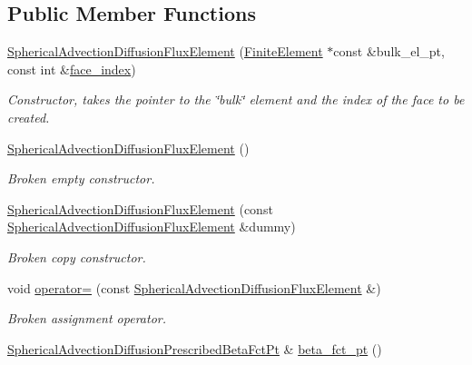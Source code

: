 \subsection*{Public Member Functions}
\begin{DoxyCompactItemize}
\item 
\hyperlink{classoomph_1_1SphericalAdvectionDiffusionFluxElement_aa8fb5f46838d3fbb9d15aca49944c671}{Spherical\+Advection\+Diffusion\+Flux\+Element} (\hyperlink{classoomph_1_1FiniteElement}{Finite\+Element} $\ast$const \&bulk\+\_\+el\+\_\+pt, const int \&\hyperlink{classoomph_1_1FaceElement_a478d577ac6db67ecc80f1f02ae3ab170}{face\+\_\+index})
\begin{DoxyCompactList}\small\item\em Constructor, takes the pointer to the \char`\"{}bulk\char`\"{} element and the index of the face to be created. \end{DoxyCompactList}\item 
\hyperlink{classoomph_1_1SphericalAdvectionDiffusionFluxElement_afd26b6adc3a9a6402b38a3c15fc16c0a}{Spherical\+Advection\+Diffusion\+Flux\+Element} ()
\begin{DoxyCompactList}\small\item\em Broken empty constructor. \end{DoxyCompactList}\item 
\hyperlink{classoomph_1_1SphericalAdvectionDiffusionFluxElement_a85e2f9e5a93f978b21cbf6d425d8c991}{Spherical\+Advection\+Diffusion\+Flux\+Element} (const \hyperlink{classoomph_1_1SphericalAdvectionDiffusionFluxElement}{Spherical\+Advection\+Diffusion\+Flux\+Element} \&dummy)
\begin{DoxyCompactList}\small\item\em Broken copy constructor. \end{DoxyCompactList}\item 
void \hyperlink{classoomph_1_1SphericalAdvectionDiffusionFluxElement_afbcbd2ed140bb94e69d518fcc60960d8}{operator=} (const \hyperlink{classoomph_1_1SphericalAdvectionDiffusionFluxElement}{Spherical\+Advection\+Diffusion\+Flux\+Element} \&)
\begin{DoxyCompactList}\small\item\em Broken assignment operator. \end{DoxyCompactList}\item 
\hyperlink{classoomph_1_1SphericalAdvectionDiffusionFluxElement_a1fe86f85817dd5621ab510d37b3a8ce8}{Spherical\+Advection\+Diffusion\+Prescribed\+Beta\+Fct\+Pt} \& \hyperlink{classoomph_1_1SphericalAdvectionDiffusionFluxElement_a3e9d700a25464270aae4cfb8ac0abb66}{beta\+\_\+fct\+\_\+pt} ()

\end{DoxyCompactItemize}
